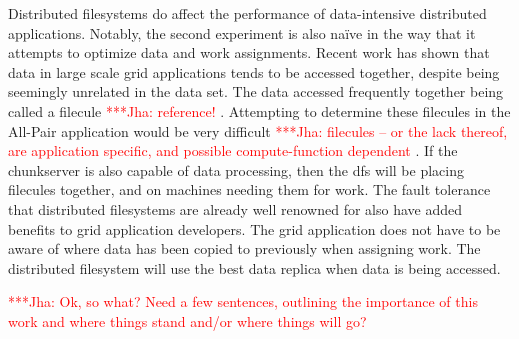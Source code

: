\documentclass[a4paper,11pt]{article}
\newcommand{\jhanote}[1]{ {\textcolor{red} { ***Jha: #1 }}}
\newcommand{\jhanote}[1]{}
\begin{document}
Distributed filesystems do affect the performance of data-intensive distributed applications.  Notably, the second experiment is also naïve in the way that it attempts to optimize data and work assignments.  Recent work has shown that data in large scale grid applications tends to be accessed together, despite being seemingly unrelated in the data set.  The data accessed frequently together being called a filecule \jhanote{reference!}.  Attempting to determine these filecules in the All-Pair application would be very difficult \jhanote{filecules -- or the lack thereof, are application specific, and possible compute-function dependent}. If the chunkserver is also capable of data processing, then the dfs will be placing filecules together, and on machines needing them for work.  The fault tolerance that distributed filesystems are already well renowned for also have added benefits to grid application developers.  The grid application does not have to be aware of where data has been copied to previously when assigning work.  The distributed filesystem will use the best data replica when data is being accessed.

\jhanote{Ok, so what? Need a few sentences, outlining the importance of this work and where
things stand and/or where things will go?}

 

\end{document}
